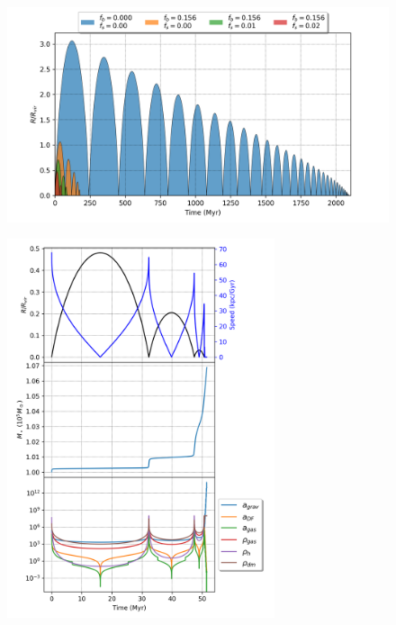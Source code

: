 	\begin{figure}[h]
		\centering
		\includegraphics[width=\textwidth]{"../Files/Week 5/stellar_density_comparison"}
	\end{figure}

	\begin{figure}[h]
		\centering
		\includegraphics[width=0.7\textwidth]{"../Files/Week 5/properties_s02v70"}
	\end{figure}
	